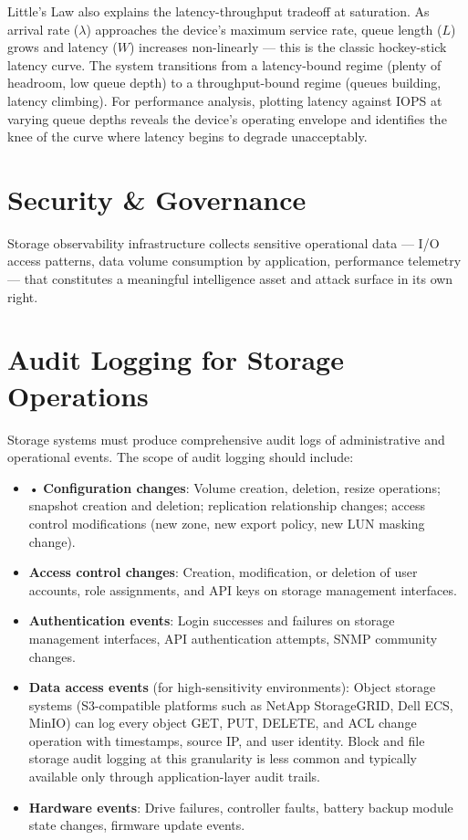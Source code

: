Little's Law also explains the latency-throughput tradeoff at saturation. As arrival rate ($\lambda$) approaches the device's maximum service rate, queue length ($L$) grows and latency ($W$) increases non-linearly --- this is the classic hockey-stick latency curve. The system transitions from a latency-bound regime (plenty of headroom, low queue depth) to a throughput-bound regime (queues building, latency climbing). For performance analysis, plotting latency against IOPS at varying queue depths reveals the device's operating envelope and identifies the knee of the curve where latency begins to degrade unacceptably.


\section{Security \& Governance}
Storage observability infrastructure collects sensitive operational data --- I/O access patterns, data volume consumption by application, performance telemetry --- that constitutes a meaningful intelligence asset and attack surface in its own right.

\section{Audit Logging for Storage Operations}
Storage systems must produce comprehensive audit logs of administrative and operational events. The scope of audit logging should include:

\begin{itemize}
  \item • \textbf{Configuration changes}: Volume creation, deletion, resize operations; snapshot creation and deletion; replication relationship changes; access control modifications (new zone, new export policy, new LUN masking change).
  \item \textbf{Access control changes}: Creation, modification, or deletion of user accounts, role assignments, and API keys on storage management interfaces.
  \item \textbf{Authentication events}: Login successes and failures on storage management interfaces, API authentication attempts, SNMP community changes.
  \item \textbf{Data access events} (for high-sensitivity environments): Object storage systems (S3-compatible platforms such as NetApp StorageGRID, Dell ECS, MinIO) can log every object GET, PUT, DELETE, and ACL change operation with timestamps, source IP, and user identity. Block and file storage audit logging at this granularity is less common and typically available only through application-layer audit trails.
  \item \textbf{Hardware events}: Drive failures, controller faults, battery backup module state changes, firmware update events.
\end{itemize}


